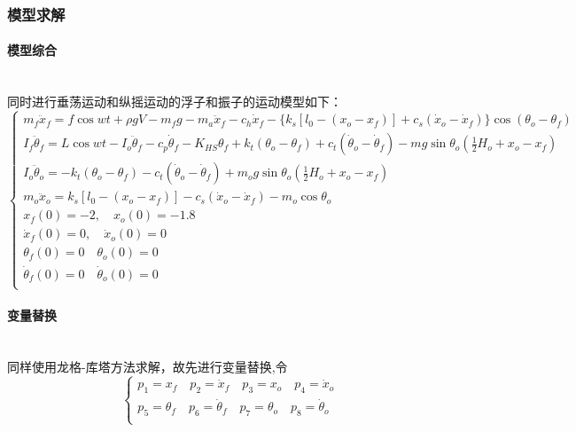 \documentclass{my_paper}
\newcommand{\subsubsubsection}[1]{\paragraph{#1}\mbox{}\\}
\begin{document}
\subsubsection{模型求解}

\subsubsubsection{模型综合}

同时进行垂荡运动和纵摇运动的浮子和振子的运动模型如下：
\begin{equation}
    \left\{\begin{matrix}
    m_f\ddot {x}_f=f \cos wt+\rho g V-m_f g-m_{a}\ddot x_f-c_h \dot x_{f}-\{k_s[l_{0}-(x_{o}-x_{f})]+c_{s}(\dot x_{o}-\dot x_{f})\}\cos(\theta_{o}-\theta_{f}) \\
        I_f\ddot\theta_{f}=L\cos wt -I_o\ddot\theta_{f}-c_p\dot\theta_{f}-K_{HS}\theta_{f}+k_t(\theta_{o}-
\theta_{f})+c_t(\dot\theta_{o}-\dot\theta_{f})-mg\sin \theta_{o}(\frac{1}{2}H_o+x_o-x_f) \\
I_o\ddot\theta_{o}=-k_t(\theta_o-\theta_f)-c_t(\dot\theta_o-\dot\theta_f)+m_og\sin \theta_{o}(\frac{1}{2}H_o+x_o-x_f)\\
m_{o}\ddot x_{o}=k_{s}[l_{0}-(x_{o}-x_{f})]-c_{s}(\dot x_{o}-\dot x_{f})-m_{o}\cos \theta_{o} \\  
x_f(0)=-2, \quad x_{o}(0)=-1.8\\
\dot x_f(0)=0, \quad \dot x_o(0)=0\\
\theta_{f} (0)=0 \quad \theta_{o}(0)=0\\
\dot\theta_{f} (0)=0 \quad \dot \theta_{o}(0)=0\\
\end{matrix}\right.
\end{equation}

\subsubsubsection{变量替换}

同样使用龙格-库塔方法求解，故先进行变量替换,令
\begin{equation}
   \left\{\begin{matrix}
       p_1=x_f \quad p_2=\dot x_f  \quad p_3=x_o \quad p_4=\dot x_o\\
       p_5=\theta_{f} \quad p_6=\dot \theta_{f} \quad p_7=\theta_{o} \quad p_8=\dot \theta_{o} \\
   \end{matrix}\right.                                  
\end{equation}
\end{document}
